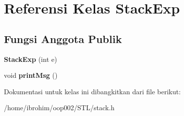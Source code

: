 \hypertarget{classStackExp}{}\section{Referensi Kelas Stack\+Exp}
\label{classStackExp}
\subsection*{Fungsi Anggota Publik}
\begin{DoxyCompactItemize}
\item 
\hypertarget{classStackExp_a2590e6d22201f3c187d83bf9e626b6e2}{}{\bfseries Stack\+Exp} (int e)\label{classStackExp_a2590e6d22201f3c187d83bf9e626b6e2}

\item 
\hypertarget{classStackExp_a8d3e08d13c04cd4577899971cbda6094}{}void {\bfseries print\+Msg} ()\label{classStackExp_a8d3e08d13c04cd4577899971cbda6094}

\end{DoxyCompactItemize}


Dokumentasi untuk kelas ini dibangkitkan dari file berikut\+:\begin{DoxyCompactItemize}
\item 
/home/ibrohim/oop002/\+S\+T\+L/stack.\+h\end{DoxyCompactItemize}
